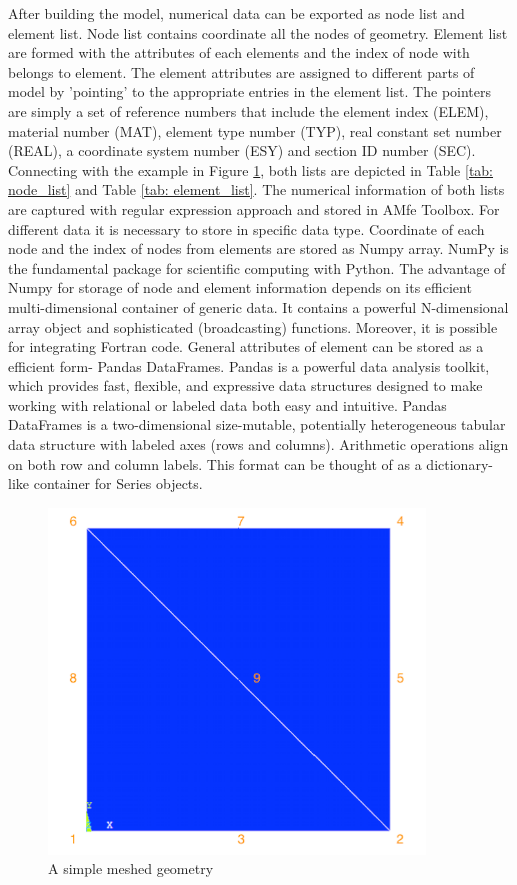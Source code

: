 After building the model, numerical data can be exported as node list and element list. Node list contains coordinate all the nodes of geometry. Element list are formed with the attributes of each elements and the index of node with belongs to element. The element attributes are assigned to different parts of model by 'pointing' to the appropriate entries in the element list. The pointers are simply a set of reference numbers that include  the element index (ELEM), material number (MAT), element type number (TYP), real constant set number (REAL), a coordinate system number (ESY) and section ID number (SEC). Connecting with the example in Figure \ref{fig: muster}, both lists are depicted in Table \ref{tab: node_list} and Table \ref{tab: element_list}. The numerical information of both lists are captured with regular expression approach and stored in AMfe Toolbox. For different data it is necessary to store in specific data type. Coordinate of each node and the index of nodes from elements are stored as Numpy array. NumPy is the fundamental package for scientific computing with Python. The advantage of Numpy for storage of node and element information depends on its efficient multi-dimensional container of generic data. It contains a powerful N-dimensional array object and sophisticated (broadcasting) functions. Moreover, it is possible for integrating Fortran code. General attributes of element can be stored as a efficient form- Pandas DataFrames. Pandas is a powerful data analysis toolkit, which provides fast, flexible, and expressive data structures designed to make working with relational or labeled data both easy and intuitive. Pandas DataFrames is a two-dimensional size-mutable, potentially heterogeneous tabular data structure with labeled axes (rows and columns). Arithmetic operations align on both row and column labels. This format can be thought of as a dictionary-like container for Series objects. 

\begin{figure}
	\begin{center}
		\includegraphics[width=10cm,clip]{muster.png} 			
		\caption{A simple meshed geometry} \label{fig: muster}
	\end{center}
\end{figure}

